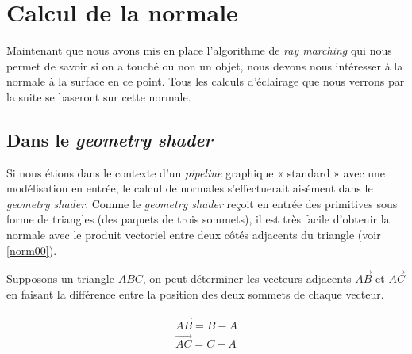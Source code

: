 

\newpage
\section{Calcul de la normale}
Maintenant que nous avons mis en place l'algorithme de \textit{ray marching} qui nous permet de savoir si on a touché ou non un objet, nous devons nous intéresser à la normale à la surface en ce point. Tous les calculs d'éclairage que nous verrons par la suite se baseront sur cette normale.

\subsection*{Dans le \textit{geometry shader}}

Si nous étions dans le contexte d'un \textit{pipeline} graphique « standard » avec une modélisation en entrée, le calcul de normales s'effectuerait aisément dans le \textit{geometry shader}. Comme le \textit{geometry shader} reçoit en entrée des primitives sous forme de triangles (des paquets de trois sommets), il est très facile d'obtenir la normale avec le produit vectoriel entre deux côtés adjacents du triangle (voir \ref{norm00}).

Supposons un triangle $ABC$, on peut déterminer les vecteurs adjacents $\vec{AB}$ et $\vec{AC}$ en faisant la différence entre la position des deux sommets de chaque vecteur.

\begin{align*} 
\vec{AB} = B - A \\
\vec{AC} = C - A
\end{align*}


